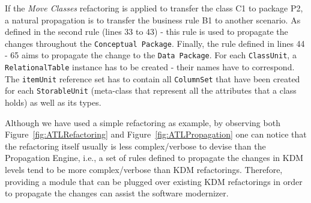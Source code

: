 If the \textit{Move Classes} refactoring is applied to transfer the class C1 to package P2, a natural propagation is to transfer the business rule B1 to another scenario. As defined in the second rule (lines 33 to 43) - this rule is used to propagate the changes throughout the \texttt{Conceptual Package}.
%
%
%
%
 Finally, the rule defined in lines 44 - 65 aims to propagate the change to the \texttt{Data Package}. For each \texttt{ClassUnit}, a \texttt{RelationalTable} instance has to be created - their names have to correspond. The \texttt{itemUnit} %
reference set has to contain all \texttt{ColumnSet} that have been created for each \texttt{StorableUnit} (meta-class that represent all the attributes that a class holds) as well as its types.



Although we have used a simple refactoring as example, by observing both Figure~\ref{fig:ATLRefactoring} and Figure~\ref{fig:ATLPropagation} one can notice that the refactoring itself usually is less complex/verbose to devise than the Propagation Engine, i.e., a set of rules defined to propagate the changes in KDM levels tend to be more complex/verbose than KDM refactorings. Therefore, providing a module that can be plugged over existing KDM refactorings in order to propagate the changes can assist the software modernizer.

